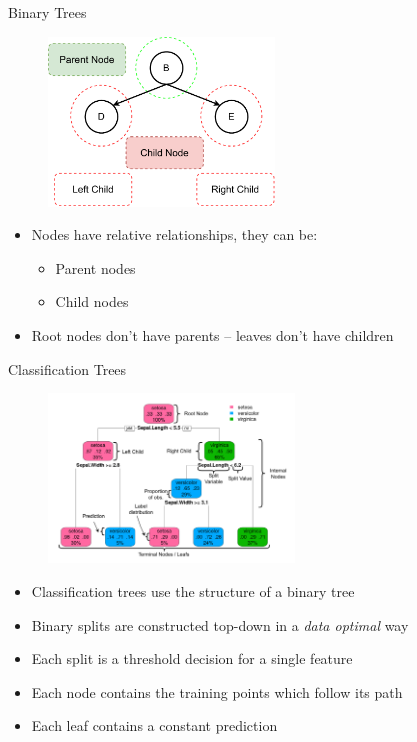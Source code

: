 \documentclass[11pt,compress,t,notes=noshow, xcolor=table]{beamer}
\begin{document}
\begin{vbframe}{Binary Trees}
    \begin{figure}
    \centering
      \includegraphics[height = 4.5cm, keepaspectratio]{figure/cart_intro_binary-tree_2.pdf}
    \end{figure}
  \begin{itemize}
    \item Nodes have relative relationships, they can be:
    \begin{itemize}
    \item Parent nodes
    \item Child nodes
    \end{itemize}
    \item Root nodes don't have parents -- leaves don't have children
    
  \end{itemize}
\end{vbframe}

\begin{vbframe}{Classification Trees}
    \begin{figure}
    \centering
      \includegraphics[height = 4.5cm, keepaspectratio]{figure/cart_intro_annotated-tree.pdf}
    \end{figure}
  \begin{itemize}
    \item Classification trees use the structure of a binary tree
    \item Binary splits are constructed top-down in a \emph{data optimal} way
    \item Each split is a threshold decision for a single feature
    \item Each node contains the training points which follow its path
    \item Each leaf contains a constant prediction
  \end{itemize}
\end{vbframe}
\end{document}
